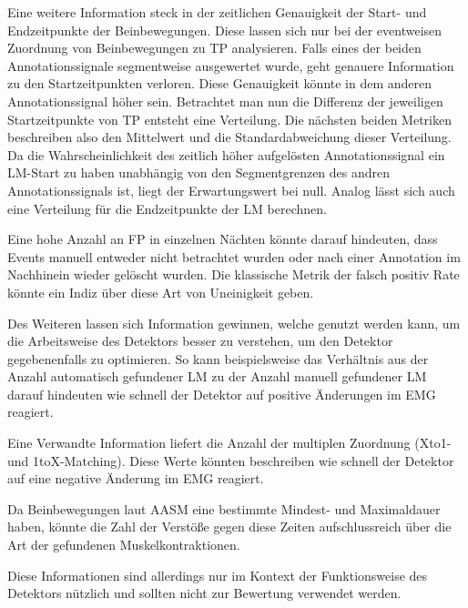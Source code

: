 Eine weitere Information steck in der zeitlichen Genauigkeit der Start- und Endzeitpunkte der Beinbewegungen. Diese lassen sich nur bei der eventweisen Zuordnung von Beinbewegungen zu TP analysieren. 
Falls eines der beiden Annotationssignale segmentweise ausgewertet wurde, geht genauere Information zu den Startzeitpunkten verloren. Diese Genauigkeit könnte in dem anderen Annotationssignal höher sein. Betrachtet man nun die Differenz der jeweiligen Startzeitpunkte von TP entsteht eine Verteilung. Die nächsten beiden Metriken beschreiben also den Mittelwert und die Standardabweichung dieser Verteilung. Da die Wahrscheinlichkeit des zeitlich höher aufgelösten Annotationssignal ein LM-Start zu haben unabhängig von den Segmentgrenzen des andren Annotationssignals ist, liegt der Erwartungswert bei null.
Analog lässt sich auch eine Verteilung für die Endzeitpunkte der LM berechnen.

Eine hohe Anzahl an FP in einzelnen Nächten könnte darauf hindeuten, dass Events manuell entweder nicht betrachtet wurden oder nach einer Annotation im Nachhinein wieder gelöscht wurden. Die klassische Metrik der falsch positiv Rate könnte ein Indiz über diese Art von Uneinigkeit geben.

Des Weiteren lassen sich Information gewinnen, welche genutzt werden kann, um die Arbeitsweise des Detektors besser zu verstehen, um den Detektor gegebenenfalls zu optimieren.
So kann beispielsweise das Verhältnis aus der Anzahl automatisch gefundener LM zu der Anzahl manuell gefundener LM darauf hindeuten wie schnell der Detektor auf positive Änderungen im EMG reagiert. 


Eine Verwandte Information liefert die Anzahl der multiplen Zuordnung (Xto1- und 1toX-Matching). Diese Werte könnten beschreiben wie schnell der Detektor auf eine negative Änderung im EMG reagiert. 

Da Beinbewegungen laut AASM eine bestimmte Mindest- und Maximaldauer haben, könnte die Zahl der Verstöße gegen diese Zeiten aufschlussreich über die Art der gefundenen Muskelkontraktionen. 

Diese Informationen sind allerdings nur im Kontext der Funktionsweise des Detektors nützlich und sollten nicht zur Bewertung verwendet werden.

